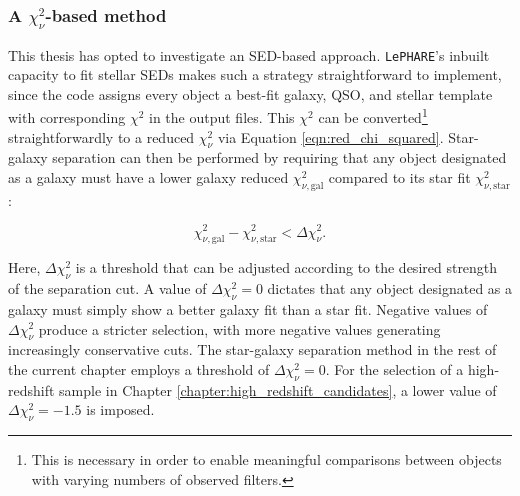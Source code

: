 \subsubsection{A \texorpdfstring{$\chi^2_{\nu}$}{TEXT}-based method}\label{subsubsection:chi_method}
This thesis has opted to investigate an SED-based approach. \texttt{LePHARE}'s inbuilt capacity to fit stellar SEDs makes such a strategy straightforward to implement, since the code assigns every object a best-fit galaxy, QSO, and stellar template with corresponding $\chi^2$ in the output files. This $\chi^2$ can  be converted\footnote{This is necessary in order to enable meaningful comparisons between objects with varying numbers of observed filters.} straightforwardly to a reduced $\chi_{\nu}^2$ via Equation \ref{eqn:red_chi_squared}.  Star-galaxy separation can then be performed by requiring that any object designated as a galaxy must have a lower galaxy reduced $\chi^2_{\nu,\mathrm{gal}}$ compared to its star fit $\chi^2_{\nu,\mathrm{star}}$: 

\begin{equation}
\chi^2_{\nu,\mathrm{gal}} - \chi^2_{\nu,\mathrm{star}} < \Delta \chi^2_{\nu}. \label{eqn:star_galaxy}
\end{equation}

\noindent Here, $\Delta \chi^2_{\nu}$ is a threshold that can be adjusted according to the desired strength of the separation cut. A value of $\Delta \chi^2_{\nu} = 0$ dictates that any object designated as a galaxy must simply show a better galaxy fit than a star fit. Negative values of $\Delta \chi^2_{\nu}$ produce a stricter selection, with more negative values generating increasingly conservative cuts. The star-galaxy separation method in the rest of the current chapter employs a threshold of $\Delta \chi^2_{\nu}=0$. For the selection of a high-redshift sample in Chapter \ref{chapter:high_redshift_candidates}, a lower value of $\Delta \chi^2_{\nu}=-1.5$ is imposed. \par


